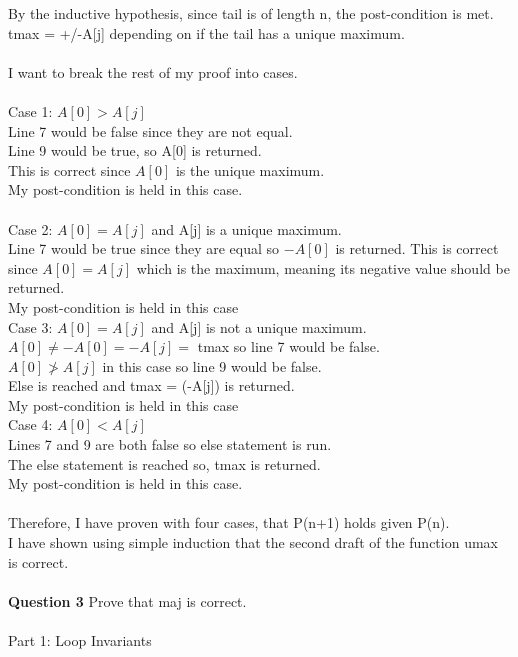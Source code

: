 \documentclass[12pt]{article}
\begin{document}
By the inductive hypothesis, since tail is of length n, the post-condition is met.\\
tmax = +/-A[j] depending on if the tail has a unique maximum.\\
\\
I want to break the rest of my proof into cases.\\
\\
Case 1: $A[0] > A[j]$\\
Line 7 would be false since they are not equal.\\
Line 9 would be true, so A[0] is returned.\\
This is correct since $A[0]$ is the unique maximum.\\
My post-condition is held in this case.\\
\\
Case 2: $A[0] = A[j]$ and A[j] is a unique maximum.\\
Line 7 would be true since they are equal so $-A[0]$ is returned.
This is correct since $A[0] = A[j]$ which is the maximum, meaning its negative value should be returned.\\
My post-condition is held in this case
\\
Case 3: $A[0] = A[j]$ and A[j] is not a unique maximum.\\
$A[0] \not = -A[0] = -A[j] = $ tmax so line 7 would be false.\\
$A[0] \not > A[j]$ in this case so line 9 would be false.\\
Else is reached and tmax = (-A[j]) is returned.\\
My post-condition is held in this case
\\
Case 4: $A[0] < A[j]$\\
Lines 7 and 9 are both false so else statement is run.\\
The else statement is reached so, tmax is returned.\\
My post-condition is held in this case.\\
\\
Therefore, I have proven with four cases, that P(n+1) holds given P(n).\\
I have shown using simple induction that the second draft of the function umax is correct.
\\
\\
\noindent\textbf{Question 3} Prove that maj is correct.
\\
\\
Part 1: Loop Invariants\\
\end{document}
